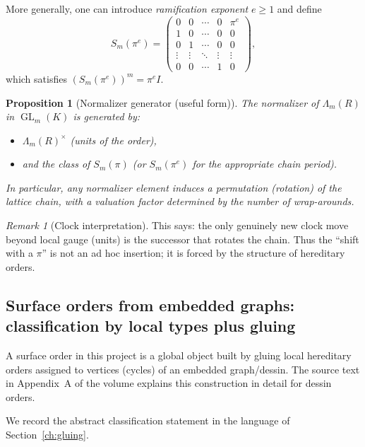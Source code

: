 \documentclass[11pt,oneside]{amsbook}
\numberwithin{equation}{section}
\theoremstyle{plain}
\newtheorem{proposition}[theorem]{Proposition}
\theoremstyle{definition}
\theoremstyle{remark}
\newtheorem{remark}[theorem]{Remark}
\DeclareMathOperator{\GL}{\mathrm{GL}}
\begin{document}
More generally, one can introduce \emph{ramification exponent} $e\ge 1$ and define
\begin{equation}
\label{eq:twisted_shift_e}
S_m(\pi^e)=
\begin{pmatrix}
0 & 0 & \cdots & 0 & \pi^e\\
1 & 0 & \cdots & 0 & 0\\
0 & 1 & \cdots & 0 & 0\\
\vdots & \vdots & \ddots & \vdots & \vdots\\
0 & 0 & \cdots & 1 & 0
\end{pmatrix},
\end{equation}
which satisfies $(S_m(\pi^e))^m=\pi^e I$.

\begin{proposition}[Normalizer generator (useful form)]
\label{prop:normalizer_generator}
The normalizer of $\Lambda_m(R)$ in $\GL_m(K)$ is generated by:
\begin{itemize}
\item $\Lambda_m(R)^\times$ (units of the order),
\item and the class of $S_m(\pi)$ (or $S_m(\pi^e)$ for the appropriate chain period).
\end{itemize}
In particular, any normalizer element induces a permutation (rotation) of the lattice chain, with a valuation factor determined by the number of wrap-arounds.
\end{proposition}

\begin{remark}[Clock interpretation]
This says: the only genuinely new clock move beyond local gauge (units) is the successor that rotates the chain.
Thus the ``shift with a $\pi$'' is not an ad hoc insertion; it is forced by the structure of hereditary orders.
\end{remark}

\subsection{Surface orders from embedded graphs: classification by local types plus gluing}
\label{sec:surface_order_classification}

A surface order in this project is a global object built by gluing local hereditary orders assigned to vertices (cycles) of an embedded graph/dessin.
The source text in Appendix~A of the  volume explains this construction in detail for dessin orders.

We record the abstract classification statement in the language of Section~\ref{ch:gluing}.
\end{document}
